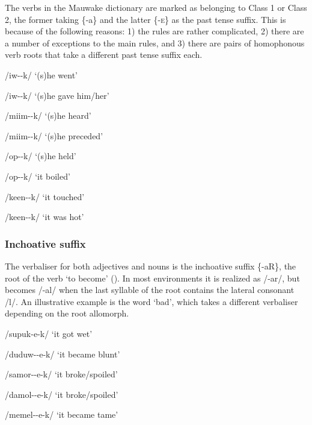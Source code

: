 The verbs in the Mauwake dictionary are marked as belonging to Class 1 or Class 2, the former taking \{-a\} and the latter \{-\textsc{e}\} as the past tense suffix. This is because of the following reasons: 1) the rules are rather complicated, 2) there are a number of exceptions to the main rules, and 3) there are pairs of homophonous verb roots that take a different past tense suffix each.

/iw--k/  `(s)he went'

/iw--k/  `(s)he gave him/her'

/miim--k/  `(s)he heard'

/miim--k/  `(s)he preceded'

/op--k/  `(s)he held'

/op--k/  `it boiled'

/keen--k/  `it touched'

/keen--k/  `it was hot'

\subsubsection[Inchoative suffix ]{Inchoative suffix} 

The verbaliser for both adjectives and nouns is the inchoative suffix \{-aR\}, the root of the verb `to become' ().  In most environments it is realized as /\nobreakdash-ar/, but becomes /-al/ when the last syllable of the root contains the lateral consonant /l/.  An illustrative example is the word  `bad', which takes a different verbaliser depending on the root allomorph.

/supuk-e-k/  `it got wet'

/duduw--e-k/  `it became blunt'

/samor--e-k/  `it broke/spoiled'

/damol--e-k/  `it broke/spoiled'

/memel--e-k/  `it became tame'


